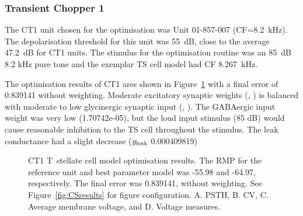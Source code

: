 

\clearpage
\subsubsection{Transient Chopper 1}

The CT1 unit chosen for the optimisation was Unit 01-857-007
\citep{PaoliniClareyEtAl:2005} (CF=8.2~kHz).  The depolarisation threshold for
this unit was 55~dB, close to the average 47.2~dB for CT1 units. The stimulus
for the optimisation routine was an 85~dB 8.2 kHz pure tone and the exemplar TS
cell model had CF 8.267~kHz.


The optimisation results of CT1 ares shown in Figure~\ref{fig:CT1results} with a
final error of 0.839141 without weighting.  Moderate excitatory synaptic weights
(, ) is balanced with moderate to low
glycinergic synaptic input (, ). The
GABAergic input weight was very low (\wGLGTS 1.70742e-05), but the loud input
stimulus (85 dB) would cause reasonable inhibition to the TS cell throughout the
stimulus.  The leak conductance had a slight decrease ($g_{\rm leak}$
0.000409819)




\begin{figure}[htb]
  \centering
  \caption[CT1 T~stellate Optimisation results]{CT1 T~stellate cell model
    optimisation results. The RMP for the reference unit and best parameter
    model was -55.98 and -64.97, respectively. The final error was 0.839141,
    without weighting. See Figure~\ref{fig:CSresults} for figure configuration.
    A. PSTH, B. CV, C. Average membrane voltage, and D. Voltage measures.}
  \label{fig:CT1results}
\end{figure}

